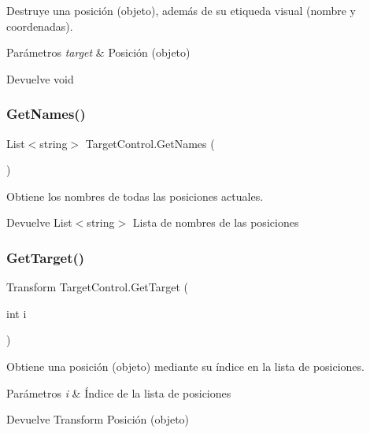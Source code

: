 Destruye una posición (objeto), además de su etiqueda visual (nombre y coordenadas). 
\begin{DoxyParams}{Parámetros}
{\em target} & Posición (objeto) \\
\hline
\end{DoxyParams}
\begin{DoxyReturn}{Devuelve}
void 
\end{DoxyReturn}
\mbox{\label{class_target_control_a0a09ff530caea4a96bbcfe88bd63f238}} 
\subsubsection{\texorpdfstring{GetNames()}{GetNames()}}
{\footnotesize\ttfamily List$<$string$>$ Target\+Control.\+Get\+Names (\begin{DoxyParamCaption}{ }\end{DoxyParamCaption})\hspace{0.3cm}{\ttfamily [inline]}}

Obtiene los nombres de todas las posiciones actuales. \begin{DoxyReturn}{Devuelve}
List$<$string$>$ Lista de nombres de las posiciones 
\end{DoxyReturn}
\mbox{\label{class_target_control_a86dcdb984de7099a9db940312a2aa541}} 
\subsubsection{\texorpdfstring{GetTarget()}{GetTarget()}\hspace{0.1cm}{\footnotesize\ttfamily [1/2]}}
{\footnotesize\ttfamily Transform Target\+Control.\+Get\+Target (\begin{DoxyParamCaption}\item[{int}]{i }\end{DoxyParamCaption})\hspace{0.3cm}{\ttfamily [inline]}}

Obtiene una posición (objeto) mediante su índice en la lista de posiciones. 
\begin{DoxyParams}{Parámetros}
{\em i} & Índice de la lista de posiciones \\
\hline
\end{DoxyParams}
\begin{DoxyReturn}{Devuelve}
Transform Posición (objeto) 
\end{DoxyReturn}
\mbox{\label{class_target_control_ac0274d2169116589048ea53988cdbc34}} 
